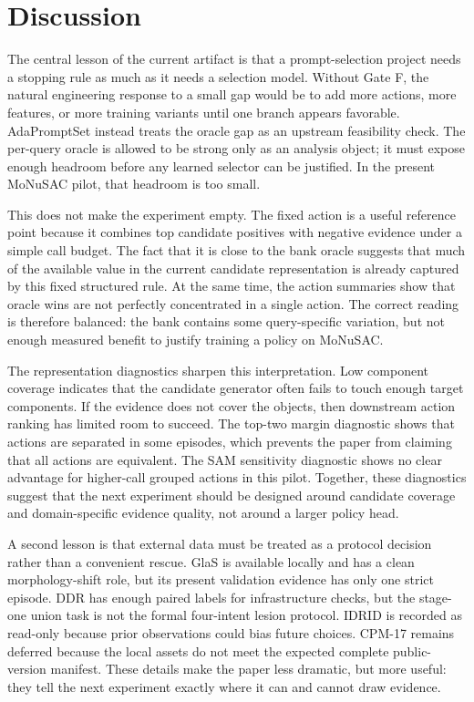 \section{Discussion}
The central lesson of the current artifact is that a prompt-selection project needs a stopping rule as much as it needs a selection model. Without Gate F, the natural engineering response to a small gap would be to add more actions, more features, or more training variants until one branch appears favorable. AdaPromptSet instead treats the oracle gap as an upstream feasibility check. The per-query oracle is allowed to be strong only as an analysis object; it must expose enough headroom before any learned selector can be justified. In the present MoNuSAC pilot, that headroom is too small.

This does not make the experiment empty. The fixed action \OracleAnalysisBestFixed{} is a useful reference point because it combines top candidate positives with negative evidence under a simple call budget. The fact that it is close to the bank oracle suggests that much of the available value in the current candidate representation is already captured by this fixed structured rule. At the same time, the action summaries show that oracle wins are not perfectly concentrated in a single action. The correct reading is therefore balanced: the bank contains some query-specific variation, but not enough measured benefit to justify training a policy on MoNuSAC.

The representation diagnostics sharpen this interpretation. Low component coverage indicates that the candidate generator often fails to touch enough target components. If the evidence does not cover the objects, then downstream action ranking has limited room to succeed. The top-two margin diagnostic shows that actions are separated in some episodes, which prevents the paper from claiming that all actions are equivalent. The SAM sensitivity diagnostic shows no clear advantage for higher-call grouped actions in this pilot. Together, these diagnostics suggest that the next experiment should be designed around candidate coverage and domain-specific evidence quality, not around a larger policy head.

A second lesson is that external data must be treated as a protocol decision rather than a convenient rescue. GlaS is available locally and has a clean morphology-shift role, but its present validation evidence has only one strict episode. DDR has enough paired labels for infrastructure checks, but the stage-one union task is not the formal four-intent lesion protocol. IDRID is recorded as read-only because prior observations could bias future choices. CPM-17 remains deferred because the local assets do not meet the expected complete public-version manifest. These details make the paper less dramatic, but more useful: they tell the next experiment exactly where it can and cannot draw evidence.

